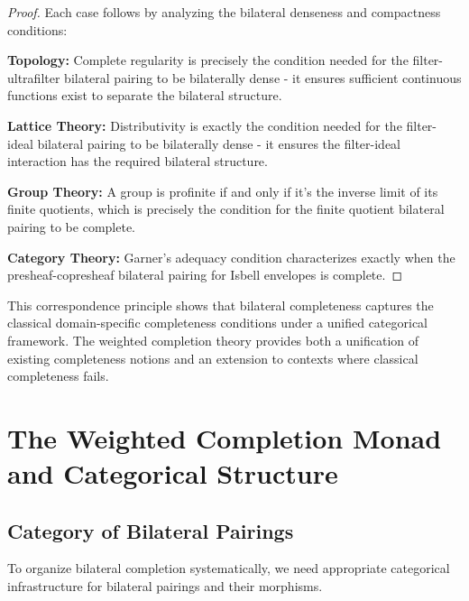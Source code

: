 \documentclass[11pt]{article}
\theoremstyle{plain}
\theoremstyle{definition}
\theoremstyle{remark}
\begin{document}
\begin{proof}
Each case follows by analyzing the bilateral denseness and compactness conditions:

\textbf{Topology:} Complete regularity is precisely the condition needed for the filter-ultrafilter bilateral pairing to be bilaterally dense - it ensures sufficient continuous functions exist to separate the bilateral structure.

\textbf{Lattice Theory:} Distributivity is exactly the condition needed for the filter-ideal bilateral pairing to be bilaterally dense - it ensures the filter-ideal interaction has the required bilateral structure.

\textbf{Group Theory:} A group is profinite if and only if it's the inverse limit of its finite quotients, which is precisely the condition for the finite quotient bilateral pairing to be complete.

\textbf{Category Theory:} Garner's adequacy condition characterizes exactly when the presheaf-copresheaf bilateral pairing for Isbell envelopes is complete.
\end{proof}

This correspondence principle shows that bilateral completeness captures the classical domain-specific completeness conditions under a unified categorical framework. The weighted completion theory provides both a unification of existing completeness notions and an extension to contexts where classical completeness fails.

\section{The Weighted Completion Monad and Categorical Structure}

\subsection{Category of Bilateral Pairings}

To organize bilateral completion systematically, we need appropriate categorical infrastructure for bilateral pairings and their morphisms.
\end{document}
